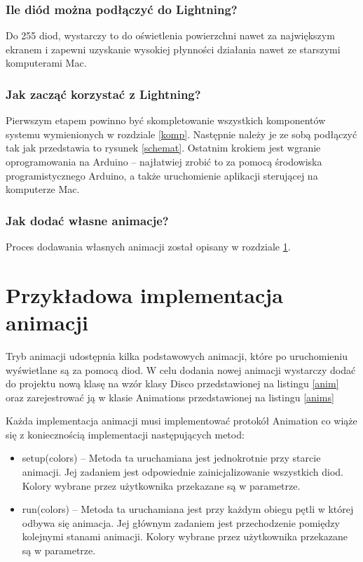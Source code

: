 \documentclass[12pt]{report}
\begin{document}
\subsubsection{Ile diód można podłączyć do Lightning?}

Do 255 diod, wystarczy to do oświetlenia powierzchni nawet za największym ekranem i zapewni uzyskanie wysokiej płynności działania nawet ze starszymi komputerami Mac.

\subsubsection{Jak zacząć korzystać z Lightning?}

Pierwszym etapem powinno być skompletowanie wszystkich komponentów systemu wymienionych w rozdziale \ref{komp}. Następnie należy je ze sobą podłączyć tak jak przedstawia to rysunek \ref{schemat}. Ostatnim krokiem jest wgranie oprogramowania na Arduino -- najłatwiej zrobić to za pomocą środowiska programistycznego Arduino, a także uruchomienie aplikacji sterującej na komputerze Mac. 

\subsubsection{Jak dodać własne animacje?}

Proces dodawania własnych animacji został opisany w rozdziale  \ref{animacje}.

\section{Przykładowa implementacja animacji} \label{animacje}

Tryb animacji udostępnia kilka podstawowych animacji, które po uruchomieniu wyświetlane są za pomocą diod. W celu dodania nowej animacji wystarczy dodać do projektu nową klasę na wzór klasy Disco przedstawionej na listingu \ref{anim} oraz zarejestrować ją w klasie Animations przedstawionej na listingu \ref{anims}

 \label{anim}

Każda implementacja animacji musi implementować protokół Animation co wiąże się z koniecznością implementacji następujących metod:

\begin{itemize}
	\item setup(colors) -- Metoda ta uruchamiana jest jednokrotnie przy starcie animacji. Jej zadaniem jest odpowiednie zainicjalizowanie wszystkich diod. Kolory wybrane przez użytkownika przekazane są w parametrze.
	\item run(colors) -- Metoda ta uruchamiana jest przy każdym obiegu pętli w której odbywa się animacja. Jej głównym zadaniem jest przechodzenie pomiędzy kolejnymi stanami animacji. Kolory wybrane przez użytkownika przekazane są w parametrze.
\end{itemize}
\end{document}
